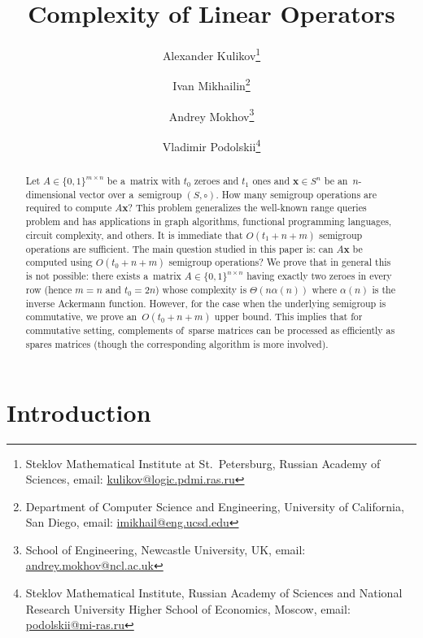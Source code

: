 \documentclass[11pt,letterpaper]{article}
\begin{document}

\sloppy
\author{
Alexander Kulikov\thanks{Steklov Mathematical Institute at St.~Petersburg, Russian Academy of Sciences, email: \href{mailto:kulikov@logic.pdmi.ras.ru}{kulikov@logic.pdmi.ras.ru}}
\and
Ivan Mikhailin\thanks{Department of Computer Science and Engineering, University
of California, San Diego, email: \href{mailto:imikhail@eng.ucsd.edu}{imikhail@eng.ucsd.edu}} \and
Andrey Mokhov\thanks{School of Engineering, Newcastle University, UK, email: \href{mailto:andrey.mokhov@ncl.ac.uk}{andrey.mokhov@ncl.ac.uk}}
\and
Vladimir Podolskii\thanks{Steklov Mathematical Institute, Russian Academy of Sciences and
National Research University Higher School of Economics, Moscow, email: \href{mailto:podolskii@mi-ras.ru}{podolskii@mi-ras.ru}}}
\date{}
\title{Complexity of Linear Operators}
\maketitle

\begin{abstract}
Let $A \in \{0,1\}^{m \times n}$ be a~matrix with $t_0$ zeroes
and $t_1$ ones and 
$\mathbf{x} \in S^{n}$ be an~$n$-dimensional vector 
over a~semigroup $(S, \circ)$. 
How many semigroup operations are required to 
compute $A\mathbf{x}$? This problem generalizes the well-known 
range queries problem and has applications in graph algorithms, 
functional programming languages, circuit complexity, and others. It 
is immediate that $O(t_1+n+m)$ semigroup operations are 
sufficient. The main question studied in this paper is: 
can $A\mathbf{x}$ be computed using $O(t_0+n+m)$ semigroup 
operations? We prove that in general this is not possible: there 
exists a~matrix $A \in \{0,1\}^{n \times n}$ having exactly two 
zeroes in every row 
(hence $m=n$ and $t_0=2n$) 
whose complexity is $\Theta(n\alpha(n))$ 
where $\alpha(n)$ is the inverse Ackermann function.
However, for the case when the underlying 
semigroup is commutative, we prove an~$O(t_0+n+m)$ upper 
bound. This implies that for commutative setting, complements 
of~sparse matrices can be processed as efficiently as spares
matrices (though the corresponding algorithm is more involved).
\end{abstract}

\tableofcontents

\section{Introduction}
\end{document}
